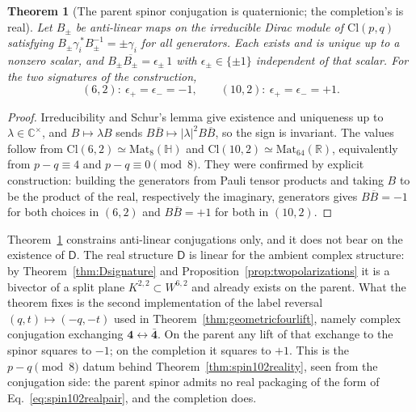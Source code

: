 \documentclass[11pt]{article}
\newtheorem{theorem}{Theorem}[section]
\theoremstyle{definition}\newtheorem{definition}[theorem]{Definition}
\theoremstyle{remark}\newtheorem{remark}[theorem]{Remark}\newtheorem{conjecture}[theorem]{Conjecture}
\begin{document}
\begin{theorem}[The parent spinor conjugation is quaternionic; the completion's is real]\label{thm:parentquaternionic}
Let $B_\pm$ be anti-linear maps on the irreducible Dirac module of $\mathrm{Cl}(p,q)$ satisfying $B_\pm\gamma_i^{\,*}B_\pm^{-1}=\pm\gamma_i$ for all generators. Each exists and is unique up to a nonzero scalar, and $B_\pm\overline{B_\pm}=\epsilon_\pm\,1$ with $\epsilon_\pm\in\{\pm1\}$ independent of that scalar. For the two signatures of the construction,
\begin{equation}\label{eq:parentquaternionic}
 (6,2):\ \epsilon_+=\epsilon_-=-1,
 \qquad
 (10,2):\ \epsilon_+=\epsilon_-=+1.
\end{equation}
\end{theorem}
\begin{proof}
Irreducibility and Schur's lemma give existence and uniqueness up to $\lambda\in\mathbb C^\times$, and $B\mapsto\lambda B$ sends $B\overline B\mapsto|\lambda|^2B\overline B$, so the sign is invariant. The values follow from $\mathrm{Cl}(6,2)\simeq\mathrm{Mat}_8(\mathbb H)$ and $\mathrm{Cl}(10,2)\simeq\mathrm{Mat}_{64}(\mathbb R)$, equivalently from $p-q\equiv4$ and $p-q\equiv0\pmod8$. They were confirmed by explicit construction: building the generators from Pauli tensor products and taking $B$ to be the product of the real, respectively the imaginary, generators gives $B\overline B=-1$ for both choices in $(6,2)$ and $B\overline B=+1$ for both in $(10,2)$.
\end{proof}

Theorem~\ref{thm:parentquaternionic} constrains anti-linear conjugations only, and it does not bear on the existence of $\mathsf D$. The real structure $\mathsf D$ is linear for the ambient complex structure: by Theorem~\ref{thm:Dsignature} and Proposition~\ref{prop:twopolarizations} it is a bivector of a split plane $K^{2,2}\subset W^{6,2}$ and already exists on the parent. What the theorem fixes is the second implementation of the label reversal $(q,t)\mapsto(-q,-t)$ used in Theorem~\ref{thm:geometricfourlift}, namely complex conjugation exchanging $\mathbf 4\leftrightarrow\bar{\mathbf 4}$. On the parent any lift of that exchange to the spinor squares to $-1$; on the completion it squares to $+1$. This is the $p-q\pmod 8$ datum behind Theorem~\ref{thm:spin102reality}, seen from the conjugation side: the parent spinor admits no real packaging of the form of Eq.~\eqref{eq:spin102realpair}, and the completion does.
\end{document}
